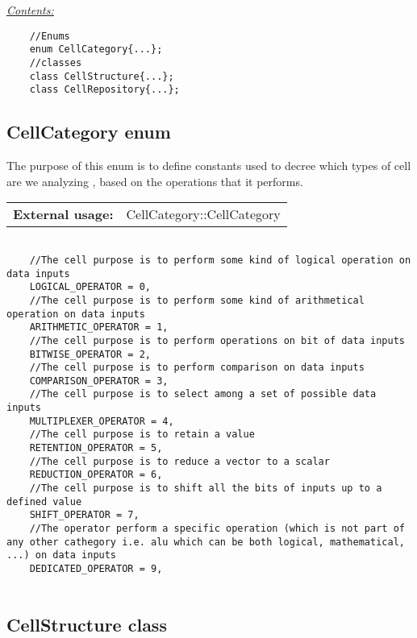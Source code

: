 \documentclass{article}
\begin{document}
\underline{\textit{\underline{Contents: }}}\\

\begin{mdframed}[hidealllines=true, backgroundcolor=green!10]
	\begin{lstlisting}
	//Enums
	enum CellCategory{...};
	//classes
	class CellStructure{...};
	class CellRepository{...};
	\end{lstlisting}
\end{mdframed}

\subsection{CellCategory enum}

The purpose of this enum is to define constants used to decree which types of cell are we analyzing , based on the operations that it performs.\\

\begin{tabular}{ll}
	\textbf{External usage: } & CellCategory::CellCategory\\
\end{tabular}

\begin{mdframed}[hidealllines=true, backgroundcolor=magenta!10]
	\begin{lstlisting}[basicstyle=\tiny]
	
	//The cell purpose is to perform some kind of logical operation on data inputs
	LOGICAL_OPERATOR = 0,
	//The cell purpose is to perform some kind of arithmetical operation on data inputs
	ARITHMETIC_OPERATOR = 1,
	//The cell purpose is to perform operations on bit of data inputs
	BITWISE_OPERATOR = 2,
	//The cell purpose is to perform comparison on data inputs
	COMPARISON_OPERATOR = 3,
	//The cell purpose is to select among a set of possible data inputs
	MULTIPLEXER_OPERATOR = 4,
	//The cell purpose is to retain a value
	RETENTION_OPERATOR = 5,
	//The cell purpose is to reduce a vector to a scalar
	REDUCTION_OPERATOR = 6,
	//The cell purpose is to shift all the bits of inputs up to a defined value
	SHIFT_OPERATOR = 7, 
	//The operator perform a specific operation (which is not part of any other cathegory i.e. alu which can be both logical, mathematical, ...) on data inputs
	DEDICATED_OPERATOR = 9,
	
	\end{lstlisting}
\end{mdframed}

\subsection{CellStructure class}
\end{document}
